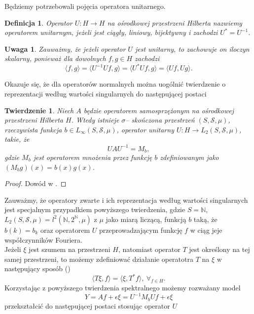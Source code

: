 \documentclass{article}
\newtheorem{tw}{Twierdzenie}
\newtheorem{df}{Definicja}
\newtheorem{uw}{Uwaga}
\begin{document}
Będziemy potrzebowali pojęcia operatora unitarnego.
\begin{df}
Operator $U\colon H\to H$ na ośrodkowej przestrzeni Hilberta nazwiemy operatorem unitarnym, jeżeli jest ciągły, liniowy, bijektywny i zachodzi $U^*=U^{-1}$.
\end{df}
\begin{uw}
Zauważmy, że jeżeli operator $U$ jest unitarny, to zachowuje on iloczyn skalarny, ponieważ dla dowolnych $f,g\in H$ zachodzi
\begin{displaymath}
\langle f,g\rangle =\langle U^{-1}Uf,g\rangle =\langle U^*Uf,g\rangle =\langle Uf,Ug\rangle.
\end{displaymath}
\end{uw}
Okazuje się, że dla operatorów normalnych można uogólnić twierdzenie o reprezentacji według wartości singularnych do następującej postaci
\begin{tw}\label{spectral}
Niech $A$ będzie operatorem samosprzężonym na ośrodkowej przestrzeni Hilberta $H$. Wtedy istnieje $\sigma$-- skończona przestrzeń $(S,\mathcal{S},\mu )$, rzeczywista funkcja $b\in L_{\infty}(S,\mathcal{S},\mu )$, operator unitarny $U\colon H\to L_2(S,\mathcal{S},\mu )$, takie, że 
\begin{displaymath}
UAU^{-1}=M_b,
\end{displaymath}
gdzie $M_b$ jest operatorem mnożenia przez funkcję $b$ zdefiniowanym jako $(M_bg)(x)=b(x)g(x)$.
\end{tw}
\begin{proof}
Dowód w \cite{hindus}.
\end{proof}
Zauważmy, że operatory zwarte i ich reprezentacja według wartości singularnych jest specjalnym przypadkiem powyższego twierdzenia, gdzie $S=\mathbb{N}$, $L_2(S,\mathcal{S},\mu) =l^2(\mathbb{N},2^{\mathbb{N}},\mu )$ z $\mu$ jako miarą liczącą, funkcją $b$ taką, że $b(k)=b_k$ oraz operatorem $U$ przeprowadzającym funkcję $f$ w ciąg jeje współczynników Fouriera.\\
Jeżeli $\xi$ jest szumem na przestrzeni $H$, natomiast operator $T$ jest określony na tej samej przestrzeni, to możemy zdefiniować działanie operatotra $T$ na $\xi$ w następujący sposób (\cite{iphde})
\begin{displaymath}
\langle T\xi , f\rangle=\langle \xi, T^* f\rangle,\ \forall_{f\in H}.
\end{displaymath}
Korzystając z powyższego twierdzenia spektralnego możemy rozważany model 
\begin{displaymath}
Y=Af+\epsilon\xi=U^{-1}M_bUf+\epsilon \xi
\end{displaymath} przekształcić do następującej postaci stosując operator $U$
\end{document}
